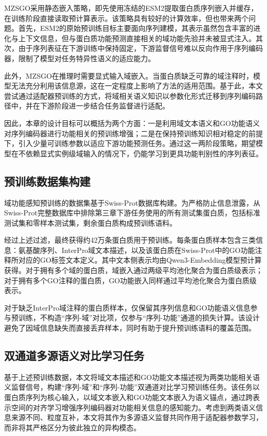 MZSGO采用静态嵌入策略，即先使用冻结的ESM2提取蛋白质序列嵌入并缓存，在训练阶段直接读取预计算表示。该策略具有较好的计算效率，但也带来两个问题。首先，ESM2的原始预训练目标主要面向序列建模，其表示虽然包含丰富的进化与上下文信息，但与蛋白质功能预测直接相关的域功能先验并未被显式注入。其次，由于序列表征在下游训练中保持固定，下游监督信号难以反向作用于序列编码器，限制了模型对任务特异性语义的适应能力。

此外，MZSGO在推理时需要显式输入域嵌入。当蛋白质缺乏可靠的域注释时，模型无法充分利用该信息源，这在一定程度上影响了方法的适用范围。基于此，本文尝试通过适配器预训练的方式，将域相关语义知识以参数化形式迁移到序列编码路径中，并在下游阶段进一步结合任务监督进行适配。

因此，本章的设计目标可以概括为两个方面：一是利用域文本语义和GO功能语义对序列编码器进行功能相关的预训练增强；二是在保持预训练知识相对稳定的前提下，引入少量可训练参数以适应下游功能预测任务。通过这一两阶段策略，期望模型在不依赖显式实例级域输入的情况下，仍能学习到更具功能判别性的序列表征。

\subsection{预训练数据集构建}

域功能感知预训练的数据集基于Swiss-Prot数据库构建。为严格防止信息泄露，从Swiss-Prot完整数据库中排除第三章下游任务使用的所有测试集蛋白质，包括标准测试集和零样本测试集，剩余蛋白质构成预训练语料。

经过上述过滤，最终获得约42万条蛋白质用于预训练。每条蛋白质样本包含三类信息：氨基酸序列、InterPro域文本描述，以及该蛋白质在Swiss-Prot中的GO功能注释所对应的GO标签文本定义。其中文本侧表示均由Qwen3-Embedding模型预计算获得。对于拥有多个域的蛋白质，域嵌入通过两级平均池化聚合为蛋白质级表示；对于拥有多个GO注释的蛋白质，GO功能嵌入同样通过平均池化聚合为蛋白质级表示。

对于缺乏InterPro域注释的蛋白质样本，仅保留其序列信息和GO功能语义信息参与预训练，不构造“序列-域”对比项，仅参与“序列-功能”通道的损失计算。该设计避免了因域信息缺失而直接丢弃样本，同时有助于提升预训练语料的覆盖范围。

\subsection{双通道多源语义对比学习任务}

基于上述预训练数据，本文将域文本描述和GO功能文本描述视为两类功能相关语义监督信号，构建“序列-域”和“序列-功能”双通道对比学习预训练任务。该任务以蛋白质序列为核心输入，以域文本嵌入和GO功能文本嵌入为语义锚点，通过跨表示空间的对齐学习增强序列编码器对功能相关信息的感知能力。考虑到两类语义信息来源不同、粒度互补，本文将其作为多源语义监督共同作用于适配器参数学习，而非将其严格区分为彼此独立的异构模态。

